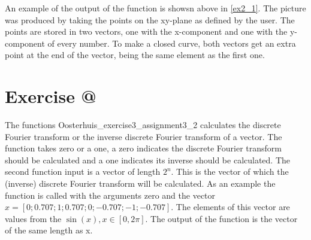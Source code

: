 \documentclass[12pt]{article}
\makeatletter
\newcommand*{\rom}[1]{\expandafter\@slowromancap\romannumeral #1@}
\makeatother
\begin{document}
An example of the output of the function is showsn above in \ref{ex2_1}. The picture was produced by taking the points on the xy-plane as defined by the user. The points are stored in two vectors, one with the x-component and one with the y-component of every number. To make a closed curve, both vectors get an extra point at the end of the vector, being the same element as the first one.

\section*{Exercise \rom{3}}

The functions Oosterhuis\_exercise3\_assignment3\_2 calculates the discrete Fourier transform or the inverse discrete Fourier transform of a vector. The function takes zero or a one, a zero indicates the discrete Fourier transform should be calculated and  a one indicates its inverse should be calculated. The second function input is a vector of length $2^n$. This is the vector of which the (inverse) discrete Fourier transform will be calculated. As an example the function is called with the arguments zero and the vector $x = [0;0.707;1;0.707;0;-0.707;-1;-0.707]$. The elements of this vector are values from the $\sin(x), x\in[0,2\pi]$. The output of the function is the vector of the same length as x.
\end{document}
